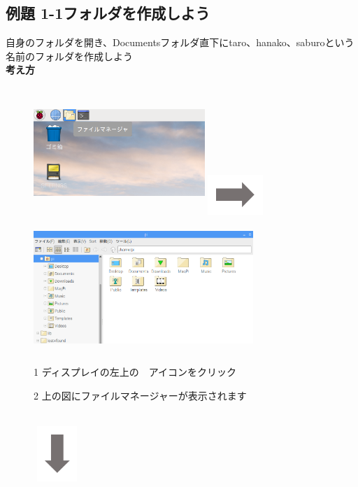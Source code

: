 \documentclass[a4paper,12pt]{jarticle}
\begin{document}
\clearpage

\subsection{例題 1-1フォルダを作成しよう}
自身のフォルダを開き、Documentsフォルダ直下にtaro、hanako、saburoという名前のフォルダを作成しよう\\

{\bf \large 考え方}
\vfill
\begin{figure}[ht]
	\begin{minipage}{\textwidth}
\includegraphics[width=6.472cm,height=4.976cm]{textbook-img032.png}
\includegraphics[width=2.094cm,height=1.771cm]{textbook-img035.png}
\includegraphics[width=8.301cm,height=4.948cm]{textbook-img033.png}
	\end{minipage}
\begin{minipage}{0.4\textwidth}
1
ディスプレイの左上の　アイコンをクリック
\end{minipage}
\hfill
\begin{minipage}{0.4\textwidth}
2
上の図にファイルマネージャーが表示されます
\end{minipage}\\
	\vspace{-12mm}
	\hfill \includegraphics[width=1.771cm,height=2.094cm]{textbook-img037.png}

\end{figure}
\end{document}
